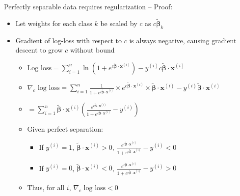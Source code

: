 Perfectly separable data requires regularization – Proof:
\begin{itemize}
    \item Let weights for each class $k$ be scaled by $c$ as $c \boldsymbol{\tilde{\beta}}_k$
    \item Gradient of log-loss with respect to $c$ is always negative, causing gradient descent to grow $c$ without bound
    \begin{itemize}
        \item $\textrm{Log loss} = \sum_{i=1}^n \ln\left(1 + e^{c \boldsymbol{\tilde{\beta}} \cdot \boldsymbol{x}^{(i)}}\right) - y^{(i)} c \boldsymbol{\tilde{\beta}} \cdot \boldsymbol{x}^{(i)}$
        \item $\nabla_c \textrm{ log loss} = \sum_{i=1}^n \frac{1}{1 + e^{c \boldsymbol{\tilde{\beta}} \cdot \boldsymbol{x}^{(i)}}} \times e^{c \boldsymbol{\tilde{\beta}} \cdot \boldsymbol{x}^{(i)}} \times \boldsymbol{\tilde{\beta}} \cdot \boldsymbol{x}^{(i)} - y^{(i)} \boldsymbol{\tilde{\beta}} \cdot \boldsymbol{x}^{(i)}$
        \item $= \sum_{i=1}^n \boldsymbol{\tilde{\beta}} \cdot \boldsymbol{x}^{(i)} \left(\frac{e^{c \boldsymbol{\tilde{\beta}} \cdot \boldsymbol{x}^{(i)}}}{1 + e^{c \boldsymbol{\tilde{\beta}} \cdot \boldsymbol{x}^{(i)}}} - y^{(i)}\right)$
        \item Given perfect separation:
        \begin{itemize}
            \item If $y^{(i)} = 1$, $\boldsymbol{\tilde{\beta}} \cdot \boldsymbol{x}^{(i)} > 0$, $\frac{e^{c \boldsymbol{\tilde{\beta}} \cdot \boldsymbol{x}^{(i)}}}{1 + e^{c \boldsymbol{\tilde{\beta}} \cdot \boldsymbol{x}^{(i)}}} - y^{(i)} < 0$
            \item If $y^{(i)} = 0$, $\boldsymbol{\tilde{\beta}} \cdot \boldsymbol{x}^{(i)} < 0$, $\frac{e^{c \boldsymbol{\tilde{\beta}} \cdot \boldsymbol{x}^{(i)}}}{1 + e^{c \boldsymbol{\tilde{\beta}} \cdot \boldsymbol{x}^{(i)}}} - y^{(i)} > 0$
        \end{itemize}
        \item Thus, for all $i$, $\nabla_c \textrm{ log loss} < 0$
    \end{itemize}
\end{itemize}